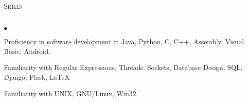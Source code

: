 \documentclass{article}
\newcommand{\lineunder}{\vspace*{-8pt} \\ \hspace*{-18pt} \hrulefill \\}
\newcommand{\header}[1]{{\hspace*{-15pt}\vspace*{6pt} \textsc{#1}} \vspace*{-6pt} \lineunder}
\newenvironment{achievements}{\begin{list}{$\bullet$}{\topsep 0pt \itemsep -2pt}}{\vspace*{4pt}\end{list}}
\begin{document}
\header{Skills}
\begin{achievements}
\item Proficiency in software development in Java, Python, C, C++, Assembly,
	Visual Basic, Android.
\item Familiarity with Regular Expressions, Threads, Sockets, Database Design,
	SQL, Django, Flask, \LaTeX
\item Familiarity with UNIX, GNU/Linux, Win32.
\end{achievements}
\end{document}
